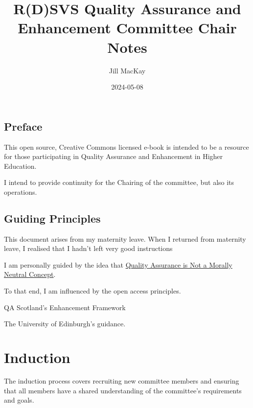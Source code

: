 \documentclass[
  letterpaper,
  DIV=11,
  numbers=noendperiod]{scrreprt}
\title{R(D)SVS Quality Assurance and Enhancement Committee Chair Notes}
\author{Jill MacKay}
\date{2024-05-08}
\renewcommand*\contentsname{Table of contents}
\newcommand\contentsname{Table of contents}
\begin{document}
\maketitle
\ifdefined\Shaded\renewenvironment{Shaded}{\begin{tcolorbox}[interior hidden, sharp corners, boxrule=0pt, frame hidden, enhanced, breakable, borderline west={3pt}{0pt}{shadecolor}]}{\end{tcolorbox}}\fi

\renewcommand*\contentsname{Table of contents}
{
\hypersetup{linkcolor=}
\setcounter{tocdepth}{2}
\tableofcontents
}

\hypertarget{preface}{%
\chapter*{Preface}\label{preface}}


This open source, Creative Commons licensed e-book is intended to be a
resource for those participating in Quality Assurance and Enhancement in
Higher Education.

I intend to provide continuity for the Chairing of the committee, but
also its operations.


\hypertarget{guiding-principles}{%
\chapter{Guiding Principles}\label{guiding-principles}}

This document arises from my maternity leave. When I returned from
maternity leave, I realised that I hadn't left very good instructions

I am personally guided by the idea that
\href{https://jillymackay.com/post/moral-quality-assurance/}{Quality
Assurance is Not a Morally Neutral Concept}.

To that end, I am influenced by the open access principles.

QA Scotland's Enhancement Framework

The University of Edinburgh's guidance.

\part{Induction}

The induction process covers recruiting new committee members and
ensuring that all members have a shared understanding of the committee's
requirements and goals.
\end{document}
